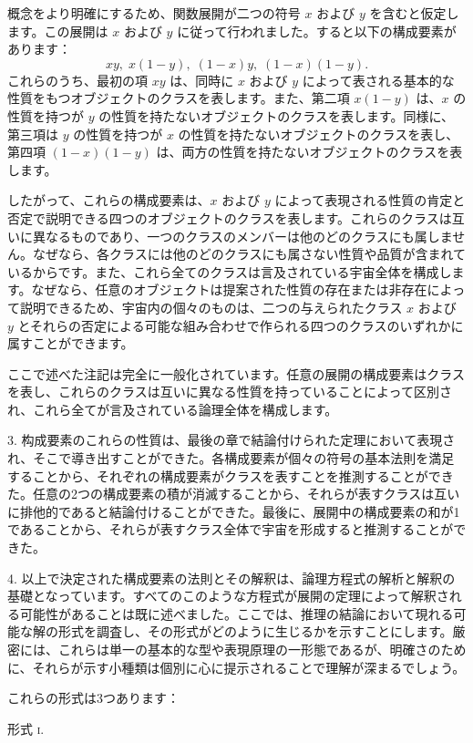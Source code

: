 \documentclass[a4paper,11pt,openany]{ltjsbook}
\begin{document}
概念をより明確にするため、関数展開が二つの符号 $x$ および $y$ を含むと仮定します。この展開は $x$ および $y$ に従って行われました。すると以下の構成要素があります：
\[
xy, \; x(1-y), \; (1-x)y, \; (1-x)(1-y).
\]
これらのうち、最初の項 $xy$ は、同時に $x$ および $y$ によって表される基本的な性質をもつオブジェクトのクラスを表します。また、第二項 $x(1-y)$ は、$x$ の性質を持つが $y$ の性質を持たないオブジェクトのクラスを表します。同様に、第三項は $y$ の性質を持つが $x$ の性質を持たないオブジェクトのクラスを表し、第四項 $(1-x)(1-y)$ は、両方の性質を持たないオブジェクトのクラスを表します。

したがって、これらの構成要素は、$x$ および $y$ によって表現される性質の肯定と否定で説明できる四つのオブジェクトのクラスを表します。これらのクラスは互いに異なるものであり、一つのクラスのメンバーは他のどのクラスにも属しません。なぜなら、各クラスには他のどのクラスにも属さない性質や品質が含まれているからです。また、これら全てのクラスは言及されている宇宙全体を構成します。なぜなら、任意のオブジェクトは提案された性質の存在または非存在によって説明できるため、宇宙内の個々のものは、二つの与えられたクラス $x$ および $y$ とそれらの否定による可能な組み合わせで作られる四つのクラスのいずれかに属すことができます。

ここで述べた注記は完全に一般化されています。任意の展開の構成要素はクラスを表し、これらのクラスは互いに異なる性質を持っていることによって区別され、これら全てが言及されている論理全体を構成します。

3. 构成要素のこれらの性質は、最後の章で結論付けられた定理において表現され、そこで導き出すことができた。各構成要素が個々の符号の基本法則を満足することから、それぞれの構成要素がクラスを表すことを推測することができた。任意の2つの構成要素の積が消滅することから、それらが表すクラスは互いに排他的であると結論付けることができた。最後に、展開中の構成要素の和が1であることから、それらが表すクラス全体で宇宙を形成すると推測することができた。

4. 以上で決定された構成要素の法則とその解釈は、論理方程式の解析と解釈の基礎となっています。すべてのこのような方程式が展開の定理によって解釈される可能性があることは既に述べました。ここでは、推理の結論において現れる可能な解の形式を調査し、その形式がどのように生じるかを示すことにします。厳密には、これらは単一の基本的な型や表現原理の一形態であるが、明確さのために、それらが示す小種類は個別に心に提示されることで理解が深まるでしょう。

これらの形式は3つあります：

\begin{center}
\textsc{形式 i}.
\end{center}
\end{document}
